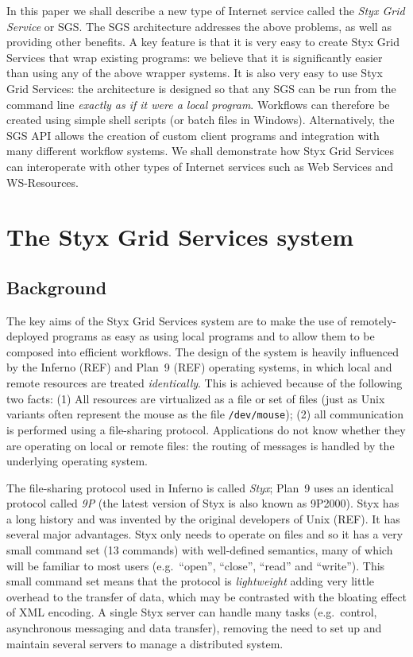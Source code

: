 \documentclass{llncs}
\begin{document}
In this paper we shall describe a new type of Internet service called the {\em Styx Grid Service\/} or SGS.  The SGS architecture addresses the above problems, as well as providing other benefits.  A key feature is that it is very easy to create Styx Grid Services that wrap existing programs: we believe that it is significantly easier than using any of the above wrapper systems.  It is also very easy to use Styx Grid Services: the architecture is designed so that any SGS can be run from the command line {\em exactly as if it were a local program\/}.  Workflows can therefore be created using simple shell scripts (or batch files in Windows).  Alternatively, the SGS API allows the creation of custom client programs and integration with many different workflow systems.  We shall demonstrate how Styx Grid Services can interoperate with other types of Internet services such as Web Services and WS-Resources.

%
\section{The Styx Grid Services system}
\subsection{Background}
The key aims of the Styx Grid Services system are to make the use of remotely-deployed programs as easy as using local programs and to allow them to be composed into efficient workflows.  The design of the system is heavily influenced by the Inferno (REF) and Plan~9 (REF) operating systems, in which local and remote resources are treated {\em identically\/}.  This is achieved because of the following two facts: (1) All resources are virtualized as a file or set of files (just as Unix variants often represent the mouse as the file {\tt /dev/mouse}); (2) all communication is performed using a file-sharing protocol.  Applications do not know whether they are operating on local or remote files: the routing of messages is handled by the underlying operating system.

The file-sharing protocol used in Inferno is called {\em Styx\/}; Plan~9 uses an identical protocol called {\em 9P\/} (the latest version of Styx is also known as 9P2000).  Styx has a long history and was invented by the original developers of Unix (REF).  It has several major advantages.  Styx only needs to operate on files and so it has a very small command set (13 commands) with well-defined semantics, many of which will be familiar to most users (e.g.\ ``open'', ``close'', ``read'' and ``write'').  This small command set means that the protocol is {\em lightweight\/} adding very little overhead to the transfer of data, which may be contrasted with the bloating effect of XML encoding.  A single Styx server can handle many tasks (e.g.\ control, asynchronous messaging and data transfer), removing the need to set up and maintain several servers to manage a distributed system.
\end{document}
